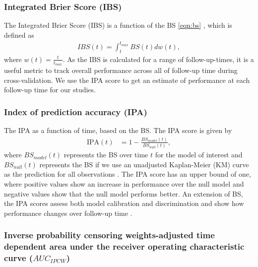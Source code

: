 \documentclass[APA,LATO1COL]{WileyNJD-v2}
\begin{document}
\hypertarget{integrated-brier-score-ibs}{%
\subsubsection{Integrated Brier Score (IBS)}\label{integrated-brier-score-ibs}}

The Integrated Brier Score (IBS) is a function of the BS \ref{eqn:bs} \citep{graf1999}, which is defined as \begin{align*}
IBS(t)=\int_{t}^{t_{max}}BS(t)dw(t),
\end{align*} where $w(t)=\frac{t}{t_{max}}$. As the IBS is calculated for a range of follow-up-times,
it is a useful metric to track overall performance across all of follow-up time during cross-validation. We use the
IPA score to get an estimate of performance at each follow-up time for our studies.



\hypertarget{index-of-prediction-accuracy-ipa}{%
\subsubsection{Index of prediction accuracy (IPA)}\label{index-of-prediction-accuracy-ipa}}

The IPA as a function of time, based on the BS. The IPA score is given by \begin{align}
\textrm{IPA}(t) &= 1-\frac{BS_{model}(t)}{BS_{null}(t)}, \nonumber
\end{align} where \(BS_{model}(t)\) represents the BS over time \(t\) for the model of interest and \(BS_{null}(t)\) represents
the BS if we use an unadjusted Kaplan-Meier (KM) curve as the prediction for all observations \citep{kattan2018index}. The
IPA score has an upper bound of one, where positive values show an increase in performance over the null model and
negative values show that the null model performs better. An extension of BS, the IPA scores assess both model calibration
and discrimination and show how performance changes over follow-up time \citep{graf1999} \citep{kattan2018index}.




\hypertarget{auc}{%
\subsubsection{Inverse probability censoring weights-adjusted time dependent area under the receiver operating characteristic curve ($AUC_{IPCW}$) }\label{auc}}
\end{document}
